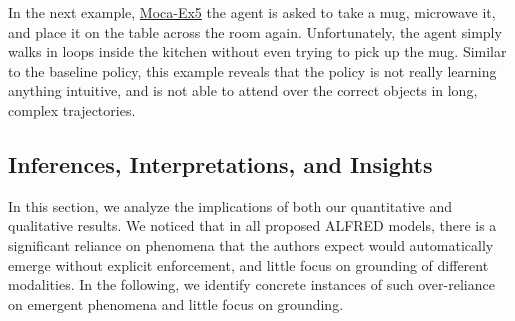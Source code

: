 \documentclass[11pt,a4paper]{article}
\begin{document}
In the next example, \href{https://drive.google.com/file/d/1F400UjTNvMC2pw7HWOOEJ3va-XKUu0nE/view?usp=sharing}{Moca-Ex5} the agent is asked to take a mug, microwave it, and place it on the table across the room again. Unfortunately, the agent simply walks in loops inside the kitchen without even trying to pick up the mug. Similar to the baseline policy, this example reveals that the policy is not really learning anything intuitive, and is not able to attend over the correct objects in long, complex trajectories.

\subsection{Inferences, Interpretations, and Insights}
\label{ssec:insights}
In this section, we analyze the implications of both our quantitative and qualitative results. We noticed that in all proposed ALFRED models, there is a significant reliance on phenomena that the authors expect would automatically emerge without explicit enforcement, and little focus on grounding of different modalities. In the following, we identify concrete instances of such over-reliance on emergent phenomena and little focus on grounding.
\end{document}
